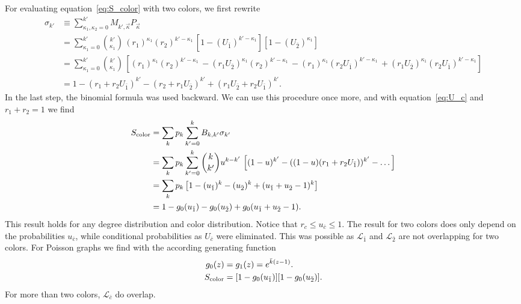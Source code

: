 \documentclass[aps, pre, onecolumn, a4paper, floatfix]{revtex4}
\begin{document}
For evaluating equation~\ref{eq:S_color} with two colors, 
we first rewrite
\begin{align}
\sigma_{k'} &\equiv \sum_{\kappa_1, \kappa_2=0}^{k'} M_{k',\vec \kappa} P_{\vec \kappa}\\
&= \sum_{\kappa_1=0}^{k'} {k' \choose \kappa_1}\, 
(r_1)^{\kappa_1} (r_2)^{k'-\kappa_1}\,
[1-(U_{\bar 1})^{k'-\kappa_1 }] [1-(U_{\bar 2})^{\kappa_1 }]\\
&= \sum_{\kappa_1=0}^{k'} {k' \choose \kappa_1}\, 
\left[
(r_1)^{\kappa_1} (r_2)^{k'-\kappa_1}\, - 
(r_1 U_{\bar 2})^{\kappa_1} (r_2)^{k'-\kappa_1}\,-
(r_1)^{\kappa_1} (r_2 U_{\bar 1})^{k'-\kappa_1}\,+
(r_1 U_{\bar 2})^{\kappa_1} (r_2 U_{\bar 1})^{k'-\kappa_1}\right]\\
 &= 1 - (r_1+r_2 U_{\bar 1})^{k'} - (r_2+r_1 U_{\bar 2})^{k'} + (r_1 U_{\bar 2} + r_2 U_{\bar 1})^{k'}.
\end{align}
In the last step, the binomial formula was used backward. 
We can use this procedure once more, and with equation~\ref{eq:U_c} and $r_1+r_2=1$ we find 
\begin{align}
S_{\rm color} &= \sum_k p_k \sum_{k'=0}^{k} B_{k,k'} \sigma_{k'} \\
 &= \sum_k p_k \sum_{k'=0}^{k} {k \choose k'}u^{k-k'}\, 
\left[
(1-u)^{k'} - ((1-u)(r_1+r_2U_{\bar 1}))^{k'} - \dots
\right]\\
 &= \sum_k p_k \left[1 - (u_{\bar 1})^k - (u_{\bar 2})^k + (u_{\bar 1}+u_{\bar 2}-1)^k\right]\\
 &= 1 - g_0(u_{\bar 1}) - g_0(u_{\bar 2}) + g_0(u_{\bar 1}+u_{\bar 2}-1).\label{eq:two_colors}
\end{align}
This result holds for any degree distribution and color distribution. 
Notice that $r_c\leq u_{\bar c}\leq 1$. 
The result for two colors does only depend on the probabilities $u_{\bar c}$, 
while conditional probabilities as $U_{\bar c}$ were eliminated. 
This was possible as $\mathcal{L}_{\bar 1}$ and $\mathcal{L}_{\bar 2}$ 
are not overlapping for two colors. 
For Poisson graphs we find with the according generating function 
\begin{align}
g_0(z) &= g_1(z) = e^{\bar{k}(z-1)}.\label{eq:g0}\\
S_{\rm color} &= [1 - g_0(u_{\bar 1})][1 - g_0(u_{\bar 2})].
\end{align}
For more than two colors, $\mathcal{L}_{\bar c}$ do overlap. 
\end{document}
